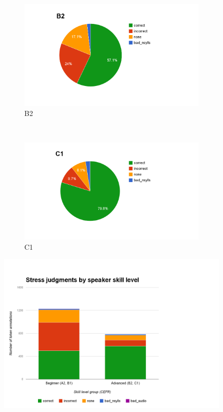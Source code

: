 \begin{figure}[htb]
				\begin{subfigure}[b]{0.5\textwidth}
					\includegraphics[width=\textwidth]{img/annotation/B2}
					\caption{B2}
					\label{fig:levelpies:B2}
				\end{subfigure}%
				~
				\begin{subfigure}[b]{0.5\textwidth}
					\includegraphics[width=\textwidth]{img/annotation/C1}
					\caption{C1}
					\label{fig:levelpies:C1}
				\end{subfigure}%
				\caption{}
				\label{fig:levelpies}
			\end{figure}		
			
			
			
			\begin{figure}[htb]
				\centering
				\includegraphics[width=\textwidth]{img/annotation/skillLevelGroupsBars}
				\caption{}
				\label{fig:levelgroupsbars}
			\end{figure}
			

